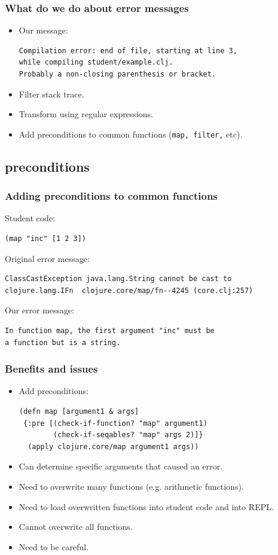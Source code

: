 \documentclass{beamer}
\begin{document}
\begin{frame}[fragile]
   \frametitle { What do we do about error messages}
\begin{itemize}
\item Our message:
\begin{verbatim}
Compilation error: end of file, starting at line 3,
while compiling student/example.clj.
Probably a non-closing parenthesis or bracket.
\end{verbatim}
\item Filter stack trace. 
\item Transform using regular expressions. 
\item Add preconditions to common functions ({\tt map, filter,} etc). 
\end{itemize}
\end{frame}

\subsection{preconditions}
\begin{frame}[fragile]
   \frametitle {Adding preconditions to common functions }
Student code:
\begin{verbatim}
(map "inc" [1 2 3])
\end{verbatim} 

Original error message:
\begin{verbatim}
ClassCastException java.lang.String cannot be cast to
clojure.lang.IFn  clojure.core/map/fn--4245 (core.clj:257)
\end{verbatim} 

Our error message: 
\begin{verbatim}
In function map, the first argument "inc" must be
a function but is a string.
\end{verbatim}
\end{frame}

\begin{frame}[fragile]
 \frametitle {Benefits and issues}
\begin{itemize}
\item Add preconditions:
\begin{verbatim}
(defn map [argument1 & args]
 {:pre [(check-if-function? "map" argument1)
        (check-if-seqables? "map" args 2)]}
  (apply clojure.core/map argument1 args))
\end{verbatim}
\item Can determine specific arguments that caused an error. 
\item Need to overwrite many functions (e.g. arithmetic functions).
\item Need to load overwritten functions into student code and into REPL.
\item Cannot overwrite all functions. 
\item Need to be careful. 
\end{itemize}
\end{frame}
\end{document}
